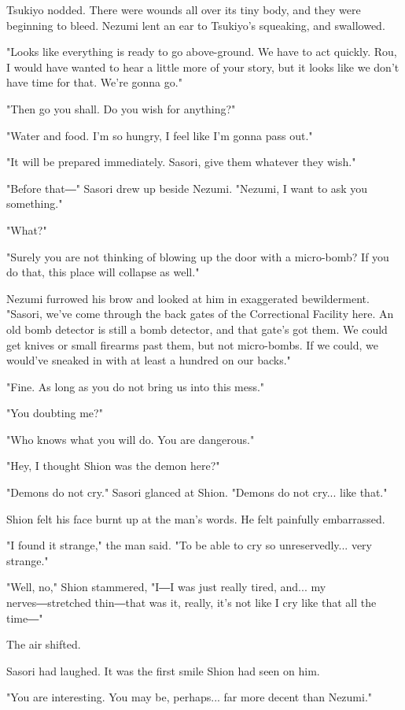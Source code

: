 Tsukiyo nodded. There were wounds all over its tiny body, and they were
beginning to bleed. Nezumi lent an ear to Tsukiyo's squeaking, and
swallowed.

"Looks like everything is ready to go above-ground. We have to act
quickly. Rou, I would have wanted to hear a little more of your story,
but it looks like we don't have time for that. We're gonna go."

"Then go you shall. Do you wish for anything?"

"Water and food. I'm so hungry, I feel like I'm gonna pass out."

"It will be prepared immediately. Sasori, give them whatever they wish."

"Before that―" Sasori drew up beside Nezumi. "Nezumi, I want to ask you
something."

"What?"

"Surely you are not thinking of blowing up the door with a micro-bomb?
If you do that, this place will collapse as well."

Nezumi furrowed his brow and looked at him in exaggerated bewilderment.
"Sasori, we've come through the back gates of the Correctional Facility
here. An old bomb detector is still a bomb detector, and that gate's got
them. We could get knives or small firearms past them, but not
micro-bombs. If we could, we would've sneaked in with at least a hundred
on our backs."

"Fine. As long as you do not bring us into this mess."

"You doubting me?"

"Who knows what you will do. You are dangerous."

"Hey, I thought Shion was the demon here?"

"Demons do not cry." Sasori glanced at Shion. "Demons do not cry... like
that."

Shion felt his face burnt up at the man's words. He felt painfully
embarrassed.

"I found it strange," the man said. "To be able to cry so
unreservedly... very strange."

"Well, no," Shion stammered, "I―I was just really tired, and... my
nerves―stretched thin―that was it, really, it's not like I cry like that
all the time―"

The air shifted.

Sasori had laughed. It was the first smile Shion had seen on him.

"You are interesting. You may be, perhaps... far more decent than
Nezumi."

